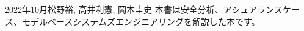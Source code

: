 \begin{preface}{2022年10月}{松野裕, 高井利憲, 岡本圭史}
本書は安全分析、アシュアランスケース、モデルベースシステムズエンジニアリングを解説した本です。



\end{preface}
